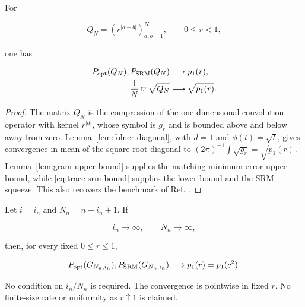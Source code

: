 \begin{proposition}\label{prop:one-change-benchmark}
For

\[
Q_N=(r^{|a-b|})_{a,b=1}^N,
\qquad 0\le r<1,
\]

one has

\begin{align}\label{eq:one-change-limit}
P_{\rm opt}(Q_N),P_{\rm SRM}(Q_N)
&\longrightarrow p_1(r), \notag\\
\frac1N\operatorname{tr}\sqrt{Q_N}
&\longrightarrow\sqrt{p_1(r)}.
\end{align}
\end{proposition}

\begin{proof}
The matrix \(Q_N\) is the compression of the one-dimensional convolution operator with kernel \(r^{|d|}\), whose symbol is \(g_r\) and is bounded above and below away from zero. Lemma~\ref{lem:folner-diagonal}, with \(d=1\) and \(\phi(t)=\sqrt t\), gives convergence in mean of the square-root diagonal to \((2\pi)^{-1}\int\sqrt{g_r}=\sqrt{p_1(r)}\). Lemma~\ref{lem:gram-upper-bound} supplies the matching minimum-error upper bound, while \eqref{eq:trace-srm-bound} supplies the lower bound and the SRM squeeze. This also recovers the benchmark of Ref. \cite{sentis2016}.
\end{proof}

\begin{theorem}\label{thm:long-known}
Let \(i=i_n\) and \(N_n=n-i_n+1\). If

\begin{equation}\label{eq:long-known-conditions}
i_n\to\infty,\qquad N_n\to\infty,
\end{equation}

then, for every fixed \(0\le r\le1\),

\begin{equation}\label{eq:long-known-limit}
P_{\rm opt}(G_{N_n,i_n}),
P_{\rm SRM}(G_{N_n,i_n})
\longrightarrow p_1(r)=p_1(c^2).
\end{equation}

No condition on \(i_n/N_n\) is required.
The convergence is pointwise in fixed \(r\). No finite-size rate or
uniformity as \(r\uparrow1\) is claimed.
\end{theorem}

